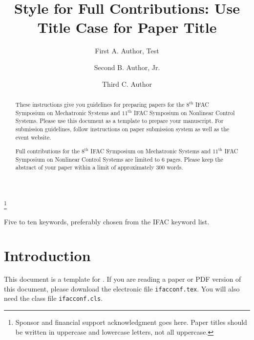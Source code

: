 \documentclass{ifacconf}
\begin{document}
\begin{frontmatter}

\title{Style for Full Contributions: Use Title Case for
  Paper Title} 

\thanks[footnoteinfo]{Sponsor and financial support acknowledgment
goes here. Paper titles should be written in uppercase and lowercase
letters, not all uppercase.}

\author[First]{First A. Author, Test} 
\author[Second]{Second B. Author, Jr.} 
\author[Third]{Third C. Author}

\address[First]{National Institute of Standards and Technology, 
   Boulder, CO 80305 USA (e-mail: author@ boulder.nist.gov).}
\address[Second]{Colorado State University, 
   Fort Collins, CO 80523 USA (e-mail: author@lamar. colostate.edu)}
\address[Third]{Electrical Engineering Department, 
   Seoul National University, Seoul, Korea, (e-mail: author@snu.ac.kr)}

\begin{abstract}                %
These instructions give you guidelines for preparing papers for the $8^{\mathrm{th}}$ IFAC Symposium on Mechatronic Systems and $11^{\mathrm{th}}$ IFAC Symposium on Nonlinear Control Systems. Please use this document as a template to prepare your manuscript. For submission guidelines, follow instructions on paper submission system as well as the event website. 

Full contributions for the $8^{\mathrm{th}}$ IFAC Symposium on Mechatronic Systems and $11^{\mathrm{th}}$ IFAC Symposium on Nonlinear Control Systems are limited to 6 pages. Please keep the abstract of your paper within a limit of approximately 300 words.
\end{abstract}

\begin{keyword}
Five to ten keywords, preferably chosen from the IFAC keyword list.
\end{keyword}

\end{frontmatter}

\section{Introduction}
This document is a template for \LaTeXe. If you are reading a paper or
PDF version of this document, please download the electronic file
\texttt{ifacconf.tex}. You will also need the class file
\texttt{ifacconf.cls}.
\end{document}
